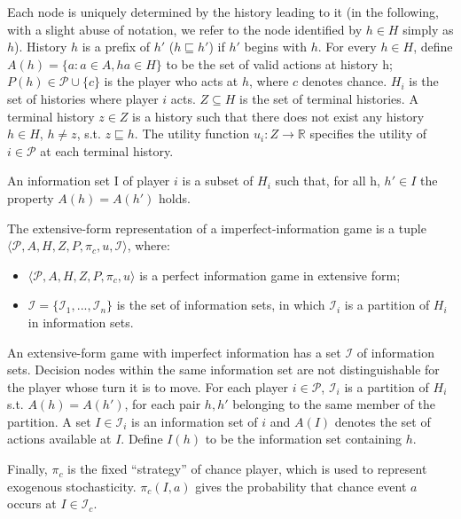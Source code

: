 \noindent
Each node is uniquely determined by the history leading to it (in the following, with a slight abuse of notation, we refer to the node identified by $h \in H$ simply as $h$).
History $h$ is a prefix of $h'$ ($h\sqsubseteq h'$) if $h'$ begins with $h$. 
For every $h\in H$, define $A(h) = \{a : a\in A, ha\in H\}$ to be the set of valid actions at history h; $P(h)\in \mathcal{P}\cup\{c\}$ is the player who acts at $h$, where $c$ denotes chance. $H_i$ is the set of histories where player $i$ acts. $Z\subseteq H$ is the set of terminal histories. A terminal history $z\in Z$ is a history such that there does not exist any history $h\in H$, $h\neq z$, s.t. $z\sqsubseteq h$. The utility function $u_i:Z\to\mathbb{R}$ specifies the utility of $i\in\mathcal{P} $ at each terminal history.

\begin{definition}
	An information set I of player $i$ is a subset of $H_i$ such that, for all h, $h' \in I$ the property $A(h)=A(h')$ holds.
\end{definition}

\begin{definition}
	The extensive-form representation of a imperfect-information game is a tuple $\langle \mathcal{P},A,H,Z,P,\pi_c,u,\mathcal{I}\rangle$, where: 
	\begin{itemize}
		\item $\langle \mathcal{P},A,H,Z,P,\pi_c,u\rangle$ is a perfect information game in extensive form;
		\item $\mathcal{I}=\{\mathcal{I}_1,...,\mathcal{I}_n\}$ is the set of information sets, in which $\mathcal{I}_i$ is a partition of $H_i$ in information sets.
	\end{itemize}
\end{definition}


An extensive-form game with imperfect information has a set $\mathcal{I}$ of information sets. Decision nodes within the same information set are not distinguishable for the player whose turn it is to move. For each player $i\in \mathcal{P}$, $\mathcal{I}_i$ is a partition of $H_i$ s.t. $A(h)=A(h')$, for each pair $h,h'$ belonging to the same member of the partition. A set $I\in \mathcal{I}_i$ is an information set of $i$ and $A(I)$ denotes the set of actions available at $I$. Define $I(h)$ to be the information set containing $h$.

Finally, $\pi_c$ is the fixed “strategy” of chance player, which is used to represent exogenous stochasticity. $\pi_c(I,a)$ gives the probability that chance event $a$ occurs at $I\in\mathcal{I}_c$. %

